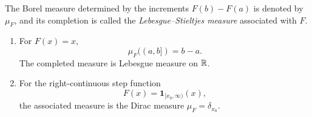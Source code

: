 \begin{remark}
  The Borel measure determined by the increments
  $F(b)-F(a)$ is denoted by $\mu_F$, and its completion is called the
  \emph{Lebesgue--Stieltjes measure} associated with $F$.
  \begin{enumerate}[label=(\roman*)]
    \item For $F(x)=x$,
      \[
        \mu_F((a,b])=b-a.
      \]
      The completed measure is Lebesgue measure on $\mathbb{R}$.
    \item For the right-continuous step function
      \[
        F(x)=\mathbf{1}_{[x_0,\infty)}(x),
      \]
      the associated measure is the Dirac measure
      $\mu_F=\delta_{x_0}$.
  \end{enumerate}
\end{remark}
